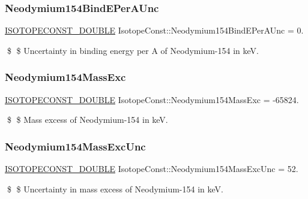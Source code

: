 \subsubsection{\texorpdfstring{Neodymium154\+Bind\+E\+Per\+A\+Unc}{Neodymium154BindEPerAUnc}}
{\footnotesize\ttfamily \mbox{\hyperlink{group___isotope_const-_macros_ga8f45a7272ce02c0b4c65c44636ed719a}{I\+S\+O\+T\+O\+P\+E\+C\+O\+N\+S\+T\+\_\+\+D\+O\+U\+B\+LE}} Isotope\+Const\+::\+Neodymium154\+Bind\+E\+Per\+A\+Unc = 0.}

\$ \$ Uncertainty in binding energy per A of Neodymium-\/154 in keV. \mbox{\label{group___isotope_const-_neodymium-_nd154_ga8da99cd6d82a6b21cb20a52b7541b6d1}} 
\subsubsection{\texorpdfstring{Neodymium154\+Mass\+Exc}{Neodymium154MassExc}}
{\footnotesize\ttfamily \mbox{\hyperlink{group___isotope_const-_macros_ga8f45a7272ce02c0b4c65c44636ed719a}{I\+S\+O\+T\+O\+P\+E\+C\+O\+N\+S\+T\+\_\+\+D\+O\+U\+B\+LE}} Isotope\+Const\+::\+Neodymium154\+Mass\+Exc = -\/65824.}

\$ \$ Mass excess of Neodymium-\/154 in keV. \mbox{\label{group___isotope_const-_neodymium-_nd154_ga3363a068100557d0dcfbd4c7c9bb247f}} 
\subsubsection{\texorpdfstring{Neodymium154\+Mass\+Exc\+Unc}{Neodymium154MassExcUnc}}
{\footnotesize\ttfamily \mbox{\hyperlink{group___isotope_const-_macros_ga8f45a7272ce02c0b4c65c44636ed719a}{I\+S\+O\+T\+O\+P\+E\+C\+O\+N\+S\+T\+\_\+\+D\+O\+U\+B\+LE}} Isotope\+Const\+::\+Neodymium154\+Mass\+Exc\+Unc = 52.}

\$ \$ Uncertainty in mass excess of Neodymium-\/154 in keV. \mbox{\label{group___isotope_const-_neodymium-_nd154_ga9a63ce0e6e93c52af6ef9e2207524c82}} 
